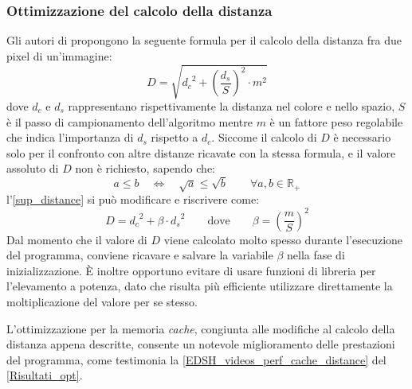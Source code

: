\documentclass[12pt,a4paper,oneside]{article}
\begin{document}
\subsubsection{Ottimizzazione del calcolo della distanza}
Gli autori di \cite{ACHANTA_SLIC} propongono la seguente formula per il calcolo della distanza fra due pixel di un'immagine:
\begin{equation}\label{sup_distance}
D = \sqrt{{d_c}^2 + \left(\frac{d_s}{S}\right)^2 \cdot m^2}
\end{equation}
dove $d_c$ e $d_s$ rappresentano rispettivamente la distanza nel colore e nello spazio, $S$ è il passo di campionamento dell'algoritmo mentre $m$ è un fattore peso regolabile che indica l'importanza di $d_s$ rispetto a $d_c$. Siccome il calcolo di $D$ è necessario solo per il confronto con altre distanze ricavate con la stessa formula, e il valore assoluto di $D$ non è richiesto, sapendo che:
\begin{equation*}
a \leq b \quad \Leftrightarrow \quad \sqrt{a} \leq \sqrt{b} \qquad \forall a,b \in \mathbb{R_+}
\end{equation*}
l'\cref{sup_distance} si può modificare e riscrivere come:
\begin{equation}\label{sup_distance_opt}
D = {d_c}^2 + \beta \cdot {d_s}^2 \qquad \text{dove} \qquad \beta = \left(\frac{m}{S}\right)^2
\end{equation}
Dal momento che il valore di $D$ viene calcolato molto spesso durante l'esecuzione del programma, conviene ricavare e salvare la variabile $\beta$ nella fase di inizializzazione. È inoltre opportuno evitare di usare funzioni di libreria per l'elevamento a potenza, dato che risulta più efficiente utilizzare direttamente la moltiplicazione del valore per se stesso.

L'ottimizzazione per la memoria \textit{cache}, congiunta alle modifiche al calcolo della distanza appena descritte, consente un notevole miglioramento delle prestazioni del programma, come testimonia la \cref{EDSH_videos_perf_cache_distance} del \cref{Risultati_opt}.
\end{document}
